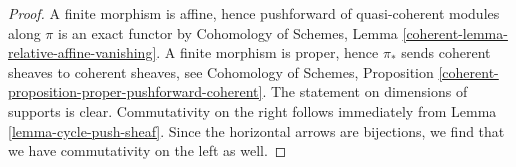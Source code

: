 \documentclass[10pt,a4paper]{amsart}
\theoremstyle{plain}
\theoremstyle{definition}
\theoremstyle{remark}
\numberwithin{equation}{subsection}
\begin{document}
\begin{proof}
A finite morphism is affine, hence pushforward of quasi-coherent
modules along $\pi$ is an exact functor by
Cohomology of Schemes, Lemma \ref{coherent-lemma-relative-affine-vanishing}.
A finite morphism is proper, hence $\pi_*$ sends coherent sheaves
to coherent sheaves, see Cohomology of Schemes, Proposition
\ref{coherent-proposition-proper-pushforward-coherent}.
The statement on dimensions of supports is clear.
Commutativity on the right follows immediately from
Lemma \ref{lemma-cycle-push-sheaf}.
Since the horizontal arrows are bijections, we find that
we have commutativity on the left as well.
\end{proof}
\end{document}
